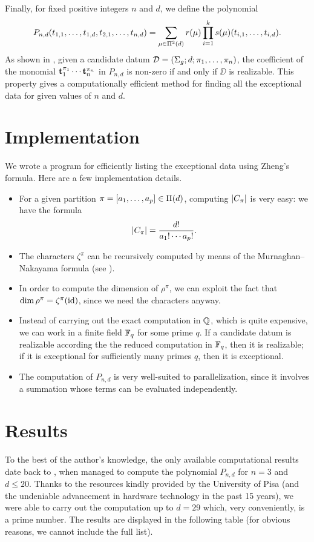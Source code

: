 Finally, for fixed positive integers $n$ and $d$, we define the polynomial
\[
P_{n,d}(t_{1,1},\ldots,t_{1,d},t_{2,1},\ldots,t_{n,d})=\sum_{\mu\in\SPartitions{d}}r(\mu)\prod_{i=1}^ks(\mu)(t_{i,1},\ldots,t_{i,d}).
\]
As shown in \cite{zheng}, given a candidate datum $\DD=\datum{\surf{g}}{d}{\pi_1,\ldots,\pi_n}$, the coefficient of the monomial $\tt_1^{\pi_1}\cdots\tt_n^{\pi_n}$ in $P_{n,d}$ is non-zero if and only if $\DD$ is realizable. This property gives a computationally efficient method for finding all the exceptional data for given values of $n$ and $d$.

\section{Implementation}\label{computational-results:sc:implementation}
We wrote a \Cpp{} program for efficiently listing the exceptional data using Zheng's formula. Here are a few implementation details.
\begin{itemize}
\item For a given partition $\pi=[a_1,\ldots,a_p]\in\Partitions{d}$, computing $\card{C_\pi}$ is very easy: we have the formula
\[
\card{C_\pi}=\frac{d!}{a_1!\cdots a_p!}.
\]
\item The characters $\zeta^\pi$ can be recursively computed by means of the Murnaghan–Nakayama formula (see ).
\item In order to compute the dimension of $\rho^\pi$, we can exploit the fact that $\dim\rho^\pi=\zeta^\pi(\id)$, since we need the characters anyway.
\item Instead of carrying out the exact computation in $\QQ$, which is quite expensive, we can work in a finite field $\FF_q$ for some prime $q$. If a candidate datum is realizable according the the reduced computation in $\FF_q$, then it is realizable; if it is exceptional for sufficiently many primes $q$, then it is exceptional.
\item The computation of $P_{n,d}$ is very well-suited to parallelization, since it involves a summation whose terms can be evaluated independently.
\end{itemize}

\section{Results}

To the best of the author's knowledge, the only available computational results date back to \citeyear{zheng}, when \citeauthor{zheng} managed to compute the polynomial $P_{n,d}$ for $n=3$ and $d\le 20$. Thanks to the resources kindly provided by the University of Pisa (and the undeniable advancement in hardware technology in the past 15 years), we were able to carry out the computation up to $d=29$ which, very conveniently, is a prime number. The results are displayed in the following table (for obvious reasons, we cannot include the full list).

